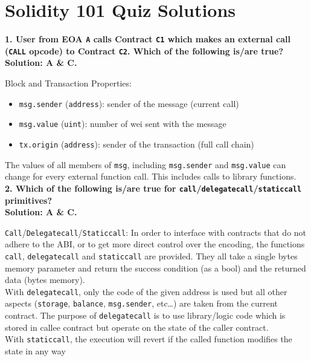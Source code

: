 \section{Solidity 101 Quiz Solutions}

\textbf{1. User from EOA \texttt{A} calls Contract \texttt{C1} which makes an external call (\texttt{CALL} opcode) to Contract \texttt{C2}.
Which of the following is/are true?}\label{sec:exam2_q1}\\

\textbf{Solution: A \& C.}

Block and Transaction Properties:
\begin{itemize}
    \item\verb|msg.sender| (\verb|address|): sender of the message (current call)
    \item\verb|msg.value| (\verb|uint|): number of wei sent with the message
    \item\verb|tx.origin| (\verb|address|): sender of the transaction (full call chain)
\end{itemize}

The values of all members of \verb|msg|, including \verb|msg.sender| and \verb|msg.value| can change for every external function call.
This includes calls to library functions.\\

\textbf{2. Which of the following is/are true for \texttt{call}/\texttt{delegatecall}/\texttt{staticcall} primitives?}\label{sec:exam2_q2}\\

\textbf{Solution: A \& C.}

\verb|Call|/\verb|Delegatecall|/\verb|Staticcall|: In order to interface with contracts that do not adhere to the ABI, or to get more direct control over the encoding, the functions \verb|call|, \verb|delegatecall| and \verb|staticcall| are provided.
They all take a single bytes memory parameter and return the success condition (as a bool) and the returned data (bytes memory).\\

With \verb|delegatecall|, only the code of the given address is used but all other aspects (\verb|storage|, \verb|balance|, \verb|msg.sender|, etc\dots) are taken from the current contract.
The purpose of \verb|delegatecall| is to use library/logic code which is stored in callee contract but operate on the state of the caller contract.\\

With \verb|staticcall|, the execution will revert if the called function modifies the state in any way\\

